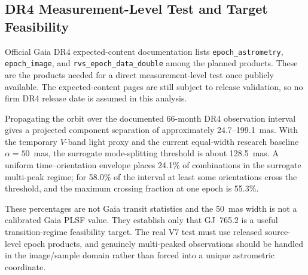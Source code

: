 \subsection{DR4 Measurement-Level Test and Target Feasibility}

Official Gaia DR4 expected-content documentation lists \texttt{epoch\_astrometry}, \texttt{epoch\_image}, and \texttt{rvs\_epoch\_data\_double} among the planned products. These are the products needed for a direct measurement-level test once publicly available. The expected-content pages are still subject to release validation, so no firm DR4 release date is assumed in this analysis.

Propagating the \citet{Balega2007} orbit over the documented 66-month DR4 observation interval gives a projected component separation of approximately 24.7--199.1~mas. With the temporary $V$-band light proxy and the current equal-width research baseline $\alpha=50$~mas, the surrogate mode-splitting threshold is about 128.5~mas. A uniform time--orientation envelope places 24.1\% of combinations in the surrogate multi-peak regime; for 58.0\% of the interval at least some orientations cross the threshold, and the maximum crossing fraction at one epoch is 55.3\%.

These percentages are not Gaia transit statistics and the 50~mas width is not a calibrated Gaia PLSF value. They establish only that GJ~765.2 is a useful transition-regime feasibility target. The real V7 test must use released source-level epoch products, and genuinely multi-peaked observations should be handled in the image/sample domain rather than forced into a unique astrometric coordinate.
